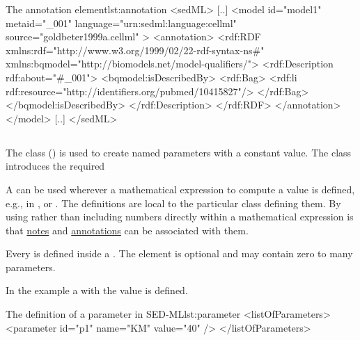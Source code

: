 \begin{myXmlLst}{The annotation element}{lst:annotation}
<sedML>
	[..]
	<model id="model1" metaid="_001" language="urn:sedml:language:cellml" source="goldbeter1999a.cellml" >
		<annotation>
    		<rdf:RDF xmlns:rdf="http://www.w3.org/1999/02/22-rdf-syntax-ns#" xmlns:bqmodel="http://biomodels.net/model-qualifiers/">
				<rdf:Description rdf:about="#_001">
				<bqmodel:isDescribedBy>
				<rdf:Bag>
					<rdf:li rdf:resource="http://identifiers.org/pubmed/10415827"/>
				</rdf:Bag>
				</bqmodel:isDescribedBy>
    			</rdf:Description>
			</rdf:RDF>
		</annotation>
	</model>
	[..]
</sedML>
\end{myXmlLst}


\subsection{}
\label{class:parameter}
The  class () is used to create named parameters with a constant value.
The  class introduces the required 


A \Parameter can be used wherever a mathematical expression to compute a value is defined, e.g., in \ComputeChange, \FunctionalRange or \DataGenerator. The \Parameter definitions are local to the particular class defining them. By using  rather than including numbers directly within a mathematical expression is that \hyperref[class:notes]{notes} and \hyperref[class:annotation]{annotations} can be associated with them.

Every \Parameter is defined inside a \ListOfParameters.  The element is optional and may contain zero to many parameters.

In the example a   with the value  is defined. 
\begin{myXmlLst}{The definition of a parameter in SED-ML}{lst:parameter}
<listOfParameters>
	<parameter id="p1" name="KM" value="40" />
</listOfParameters>
\end{myXmlLst}


